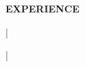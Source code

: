 


\vspace{\spaceBeforeSection}
\textbf{EXPERIENCE} \hrulefill
\vspace{\spaceAfterSection}

\textbf{\expBCompany} | \expBPosition \hfill \expBDateShort
    \begin{itemize}
        \expBDetails
    \end{itemize}

\medskip

\textbf{\expACompany} | \expAPosition \hfill \expADate
    \begin{itemize}
        \expADetails
    \end{itemize}

